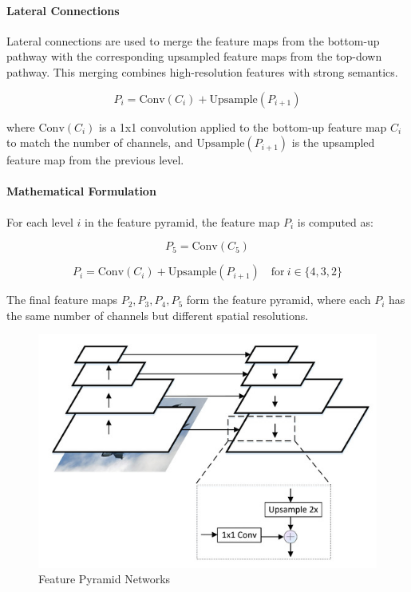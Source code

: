 \documentclass[12pt]{article}
\begin{document}
\paragraph{Lateral Connections}

Lateral connections are used to merge the feature maps from the bottom-up pathway with the corresponding upsampled feature maps from the top-down pathway. This merging combines high-resolution features with strong semantics.

\[
P_i = \text{Conv}(C_i) + \text{Upsample}(P_{i+1})
\]

where \( \text{Conv}(C_i) \) is a 1x1 convolution applied to the bottom-up feature map \( C_i \) to match the number of channels, and \( \text{Upsample}(P_{i+1}) \) is the upsampled feature map from the previous level.

\paragraph{Mathematical Formulation}

For each level \( i \) in the feature pyramid, the feature map \( P_i \) is computed as:

\[
P_5 = \text{Conv}(C_5)
\]

\[
P_i = \text{Conv}(C_i) + \text{Upsample}(P_{i+1}) \quad \text{for} \ i \in \{4, 3, 2\}
\]

The final feature maps \( P_2, P_3, P_4, P_5 \) form the feature pyramid, where each \( P_i \) has the same number of channels but different spatial resolutions.

\begin{figure}[h]
    \centering
    \includegraphics[scale=0.6]{./media/fpn.jpeg}
    \caption{Feature Pyramid Networks}
    \label{fig:fpn}
\end{figure}
\end{document}

